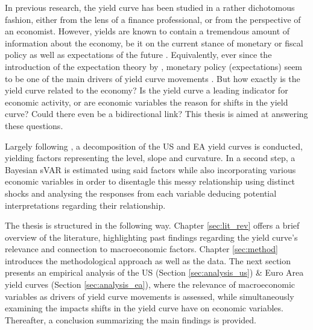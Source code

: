 In previous research, the yield curve has been studied in a rather dichotomous fashion, either from the lens of a finance professional, or from the perspective of an economist. 
However, yields are known to contain a tremendous amount of information about the economy, be it on the current stance of monetary or fiscal policy as well as expectations of the future \citep{evans2007economic}. Equivalently, ever since the introduction of the expectation theory by \citet{hicks1946value},
monetary policy (expectations) seem to be one of the main drivers of yield curve movements \citep{evans1998monetary}. 
But how exactly is the yield curve related to the economy? 
Is the yield curve a leading indicator for economic activity, or are economic variables the reason for shifts in the yield curve? 
Could there even be a bidirectional link? 
This thesis is aimed at answering these questions. 

Largely following \citet{diebold2006macroeconomy}, a \citet{nelson1987parsimonious} decomposition of the US and EA yield curves is conducted, yielding factors representing the level, slope and curvature. 
In a second step, a Bayesian sVAR is estimated using said factors while also incorporating various economic variables in order to disentagle this messy relationship using distinct shocks and analysing the responses from each variable deducing potential interpretations regarding their relationship.

The thesis is structured in the following way. 
Chapter \ref{sec:lit_rev} offers a brief overview of the literature, highlighting past findings regarding the yield curve's relevance and connection to macroeconomic factors. 
Chapter \ref{sec:method} introduces the methodological approach as well as the data.
The next section presents an empirical analysis of the US (Section \ref{sec:analysis_us}) \& Euro Area yield curves (Section \ref{sec:analysis_ea}), where the relevance of macroeconomic variables as drivers of yield curve movements is assessed, while simultaneously examining the impacts shifts in the yield curve have on economic variables.   
Thereafter, a conclusion summarizing the main findings is provided. 

